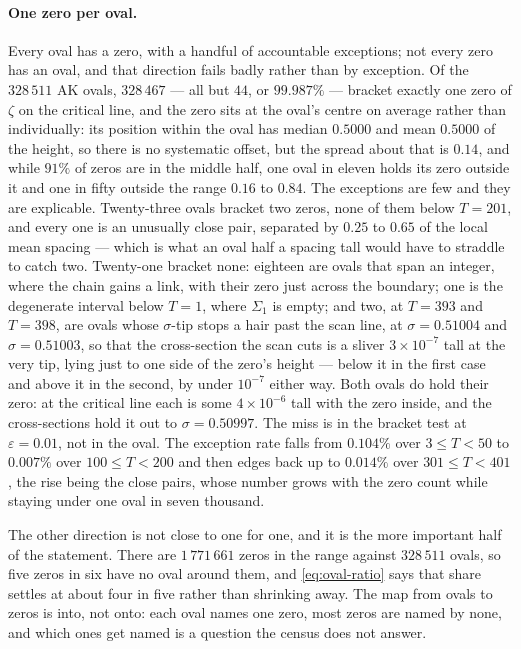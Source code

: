 \documentclass[11pt]{article}
\theoremstyle{definition}
\begin{document}
\paragraph{One zero per oval.} Every oval has a zero, with a handful of
accountable exceptions; not every zero has an oval, and that direction fails
badly rather than by exception.
Of the $328\,511$ AK ovals, $328\,467$ --- all but $44$, or $99.987\%$ ---
bracket exactly one zero of $\zeta$ on
the critical line, and the zero sits at the oval's centre on average rather than
individually: its position within the oval has median $0.5000$ and mean $0.5000$
of the height, so there is no systematic offset, but the spread about that is
$0.14$, and while $91\%$ of zeros are in the middle half, one oval in eleven
holds its zero outside it and one in fifty outside the range $0.16$ to $0.84$. The exceptions are few and they are explicable. Twenty-three
ovals bracket two zeros, none of them below $T=201$, and every one is an
unusually close pair, separated by
$0.25$ to $0.65$ of the local mean spacing --- which is what an oval half a
spacing tall would have to straddle to catch two. Twenty-one bracket none:
eighteen are ovals that span an integer, where the chain gains a link, with
their zero just across the boundary; one is the degenerate interval
below $T=1$, where $\Sigma_1$ is empty; and two, at $T=393$ and $T=398$, are
ovals whose $\sigma$-tip stops a hair past the scan line, at $\sigma=0.51004$ and
$\sigma=0.51003$, so that the cross-section the scan cuts is a sliver
$3\times10^{-7}$ tall at the very tip, lying just to one side of the zero's
height --- below it in the first case and above it in the second, by under
$10^{-7}$ either way. Both ovals do hold their zero: at the critical line each is
some $4\times10^{-6}$ tall with the zero inside, and the cross-sections hold it
out to $\sigma=0.50997$. The miss is in the bracket test at
$\varepsilon=0.01$, not in the oval. The exception rate falls
from $0.104\%$ over $3\le T<50$ to $0.007\%$ over $100\le T<200$ and then edges
back up to $0.014\%$ over $301\le T<401$, the rise being the close pairs, whose
number grows with the zero count while staying under one oval in seven
thousand.

The other direction is not close to one for one, and it is the more important
half of the statement. There are $1\,771\,661$ zeros in the range against
$328\,511$ ovals, so five zeros in six have no oval around them, and \eqref{eq:oval-ratio}
says that share settles at about four in five rather than shrinking away. The
map from ovals to zeros is into, not onto: each oval names one zero, most zeros
are named by none, and which ones get named is a question the census does not
answer.
\end{document}
